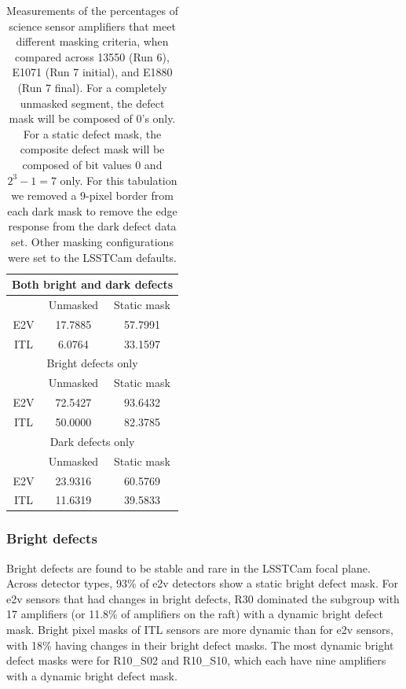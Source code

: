 \begin{table}[ht]
\centering
\begin{tabular}{|ccc|}
\hline
\multicolumn{3}{|c|}{Both bright and dark defects}                      \\ \hline
\multicolumn{1}{|c|}{}    & \multicolumn{1}{c|}{Unmasked} & Static mask \\ \hline
\multicolumn{1}{|c|}{E2V} & \multicolumn{1}{c|}{17.7885}  & 57.7991     \\ \hline
\multicolumn{1}{|c|}{ITL} & \multicolumn{1}{c|}{6.0764}   & 33.1597     \\ \hline
\multicolumn{3}{|c|}{Bright defects only}                               \\ \hline
\multicolumn{1}{|c|}{}    & \multicolumn{1}{c|}{Unmasked} & Static mask \\ \hline
\multicolumn{1}{|c|}{E2V} & \multicolumn{1}{c|}{72.5427}  & 93.6432     \\ \hline
\multicolumn{1}{|c|}{ITL} & \multicolumn{1}{c|}{50.0000}  & 82.3785     \\ \hline
\multicolumn{3}{|c|}{Dark defects only}                                 \\ \hline
\multicolumn{1}{|c|}{}    & \multicolumn{1}{c|}{Unmasked} & Static mask \\ \hline
\multicolumn{1}{|c|}{E2V} & \multicolumn{1}{c|}{23.9316}  & 60.5769     \\ \hline
\multicolumn{1}{|c|}{ITL} & \multicolumn{1}{c|}{11.6319}  & 39.5833     \\ \hline
\end{tabular}
\caption{Measurements of the percentages of science sensor amplifiers that meet different masking criteria, when compared across 13550 (Run 6), E1071 (Run 7 initial), and E1880 (Run 7 final). For a completely unmasked segment, the defect mask will be composed of 0's only. For a static defect mask, the composite defect mask will be composed of bit values 0 and $2^3-1=7$ only. For this tabulation we removed a 9-pixel border from each dark mask to remove the edge response from the dark defect data set. Other masking configurations were set to the LSSTCam defaults.}
\label{table:defectStability:measurements}
\end{table}

\subsubsection{Bright defects}

Bright defects are found to be stable and rare in the LSSTCam focal plane. Across detector types, 93\% of e2v detectors show a static bright defect mask. For e2v sensors that had changes in bright defects, R30 dominated the subgroup with 17 amplifiers (or 11.8\% of amplifiers on the raft) with a dynamic bright defect mask. Bright pixel masks of ITL sensors are more dynamic than for e2v sensors, with 18\% having changes in their bright defect masks. The most dynamic bright defect masks were for R10\_S02 and R10\_S10, which each have nine amplifiers with a dynamic bright defect mask.


